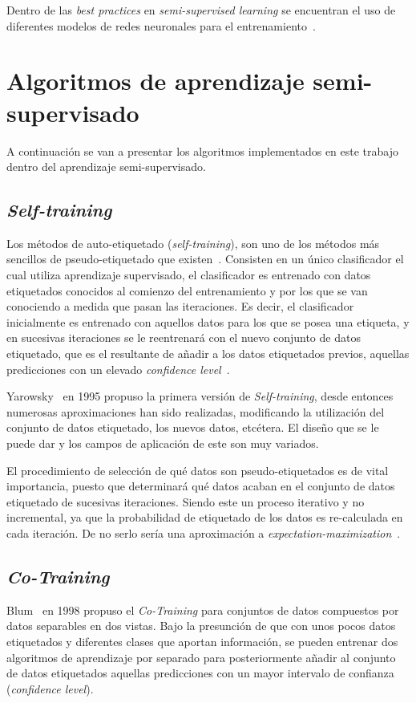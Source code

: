 Dentro de las \textit{best practices} en \textit{semi-supervised learning} se encuentran el uso de diferentes modelos de redes neuronales para el entrenamiento~\cite{thekumparampil2018attention}.


\section{Algoritmos de aprendizaje semi-supervisado}\label{sec_alg:semi-supervised}
A continuación se van a presentar los algoritmos implementados en este trabajo dentro del aprendizaje semi-supervisado.

\subsection{\textit{Self-training}}
Los métodos de auto-etiquetado (\textit{self-training}), son uno de los métodos más sencillos de pseudo-etiquetado que existen~\cite{triguero2015self}. Consisten en un único clasificador el cual utiliza aprendizaje supervisado, el clasificador es entrenado con datos etiquetados conocidos al comienzo del entrenamiento y por los que se van conociendo a medida que pasan las iteraciones. Es decir, el clasificador inicialmente es entrenado con aquellos datos para los que se posea una etiqueta, y en sucesivas iteraciones se le reentrenará con el nuevo conjunto de datos etiquetado, que es el resultante de añadir a los datos etiquetados previos, aquellas predicciones con un elevado \textit{confidence level}~\cite{jesper2020survey}.

Yarowsky~\cite{yarowsky1995unsupervised} en 1995 propuso la primera versión de \textit{Self-training}, desde entonces numerosas aproximaciones han sido realizadas, modificando la utilización del conjunto de datos etiquetado, los nuevos datos, etcétera. El diseño que se le puede dar y los campos de aplicación de este son muy variados.

El procedimiento de selección de qué datos son pseudo-etiquetados es de vital importancia, puesto que determinará qué datos acaban en el conjunto de datos etiquetado de sucesivas iteraciones. Siendo este un proceso iterativo y no incremental, ya que la probabilidad de etiquetado de los datos es re-calculada en cada iteración. De no serlo sería una aproximación a \textit{expectation-maximization}~\cite{dempster1977maximum}.

\subsection{\textit{Co-Training}}
Blum~\cite{blum1998combining} en 1998 propuso el \textit{Co-Training} para conjuntos de datos compuestos por datos separables en dos vistas. Bajo la presunción de que con unos pocos datos etiquetados y diferentes clases que aportan información, se pueden entrenar dos algoritmos de aprendizaje por separado para posteriormente añadir al conjunto de datos etiquetados aquellas predicciones con un mayor intervalo de confianza (\textit{confidence level}).

